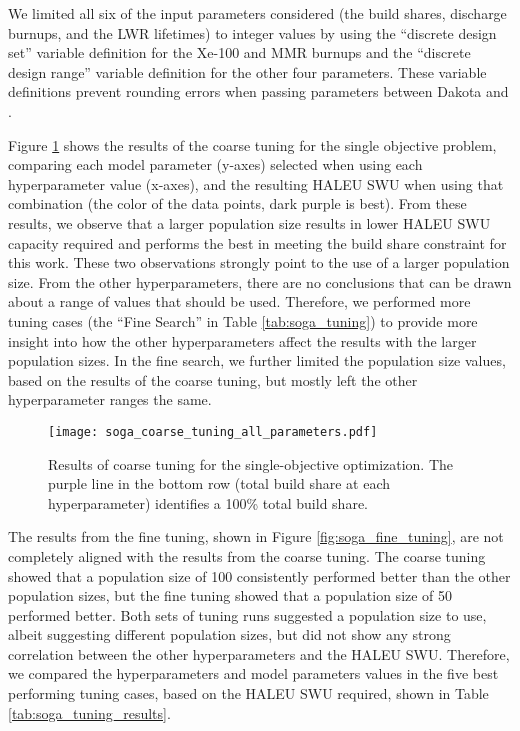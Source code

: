 We limited all six of the input parameters considered (the build shares, 
discharge burnups, and the \gls{LWR} lifetimes) to integer
values by using the ``discrete design set'' variable definition for the 
Xe-100 and \gls{MMR} burnups and the ``discrete design range'' variable 
definition for the other four parameters. These variable definitions  
prevent rounding errors when passing parameters between Dakota 
and \Cyclus. 

Figure \ref{fig:soga_coarse_tuning} shows the results of the coarse tuning 
for the single objective problem, comparing each model parameter (y-axes) 
selected when using each hyperparameter value (x-axes), and the resulting 
\gls{HALEU} \gls{SWU} when using that combination (the color of the data 
points, dark purple is best). From these results, we observe that a 
larger population size results in lower \gls{HALEU} \gls{SWU} capacity required
and performs the best in meeting the build share constraint for this work. 
These two observations strongly point to the use of a larger population size. 
From the other hyperparameters, there are no conclusions that can be drawn 
about a range of values that should be used. 
Therefore, we performed more tuning cases (the ``Fine Search'' in Table 
\ref{tab:soga_tuning}) to provide more insight into how the other hyperparameters 
affect the results with the larger population sizes. In the fine search, we 
further limited the population size values, based on the results of the 
coarse tuning, but mostly left the other hyperparameter ranges the 
same.

\begin{figure}[h!]
    \texttt{[image: soga\_coarse\_tuning\_all\_parameters.pdf]}
    \caption{Results of coarse tuning for the single-objective 
    optimization. The purple line in the bottom row (total build 
    share at each hyperparameter) identifies a 100\% total build share.}
    \label{fig:soga_coarse_tuning}
\end{figure}

The results from the fine tuning, shown in Figure \ref{fig:soga_fine_tuning},
are not completely aligned with the results from the coarse tuning. 
The coarse tuning showed that a population size of 100 consistently performed 
better than the other population sizes, but the fine tuning showed that a 
population size of 50 performed better. Both sets of tuning runs suggested 
a population size to use, albeit suggesting different population sizes, 
but did not show any strong correlation between 
the other hyperparameters and the \gls{HALEU} \gls{SWU}. Therefore, 
we compared 
the hyperparameters and model parameters values in the five best performing 
tuning cases, based on the \gls{HALEU} \gls{SWU} required, shown in 
Table \ref{tab:soga_tuning_results}.

